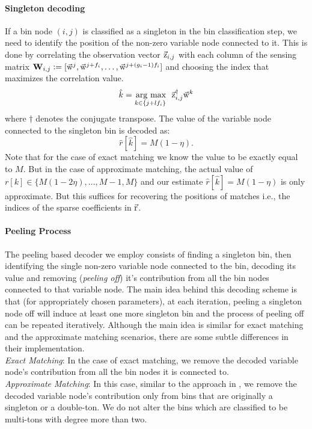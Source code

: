 \paragraph*{Singleton decoding}
If a bin node $(i,j)$ is classified as a singleton in the bin classification step, we need to identify the position of the non-zero variable node connected to it. This is done by correlating the observation vector $\vec{\mathrm{z}}_{i,j}$ with each column of the sensing matrix  $\mathbf{W}_{i,j} \mathrel{\mathop:}= [\vec{\mathrm{w}}^{j},\vec{\mathrm{w}}^{j+f_i},\ldots,   \vec{\mathrm{w}}^{j+(g_i-1)f_i}]$ and choosing the index that maximizes the correlation value.
\begin{align*}
 \hat{k} = \underset{k\in\{j+l f_i\}}{\operatorname*{\,arg\ max}}~~ \vec{\mathrm{z}}^{\dagger}_{i,j} \vec{\mathrm{w}}^{k}
\end{align*}
where $\dagger$ denotes the conjugate transpose. The value of the variable node connected to the singleton bin is decoded as:
 $$
 \hat{r}[\hat{k}]=M(1-\eta).
 $$\vspace{-3pt}
 Note that for the case of exact matching we know the value to be exactly equal to $M$. But in the case of approximate matching, the actual value of $r[k]\in\{M(1-2\eta),\ldots,M-1,M\}$ and our estimate $\hat{r}[\hat{k}]=M(1-\eta)$ is only approximate. But this suffices for recovering the positions of matches i.e., the indices of the sparse coefficients in $\vec{\mathrm{r}}$.			

\paragraph*{Peeling Process} The peeling based decoder we employ consists of finding a singleton bin, then identifying the single non-zero variable node connected to the bin, decoding its value and removing ({\it peeling off}) it's contribution from all the bin nodes connected to that variable node. The main idea behind this decoding scheme is that (for appropriately chosen parameters), at each iteration, peeling a singleton node off will induce at least one more singleton bin and the process of peeling off can be repeated iteratively. Although the main idea is similar for exact matching and the approximate matching scenarios, there are some subtle differences in their implementation.\\
{\it Exact Matching}: In the case of exact matching, we remove the decoded variable node's contribution from all the bin nodes it is connected to.\\
{\it Approximate Matching}: In this case, similar to the approach in \cite{lee2015saffron},  we remove the decoded variable node's contribution only from bins that are originally a singleton or a double-ton. We do not alter the bins which are classified to be multi-tons with degree more than two.

